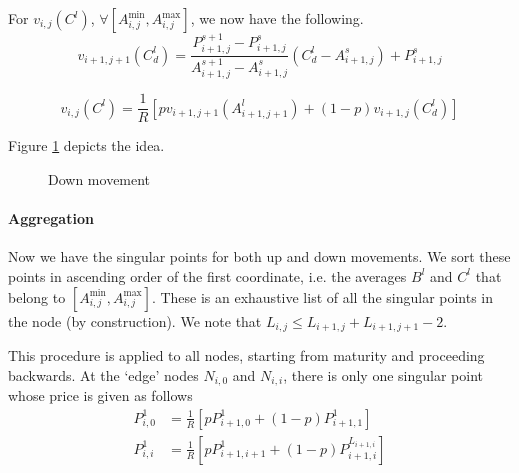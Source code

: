 For $ v_{i,j}( C^l ) $, $ \forall \left[ A_{i,j}^{\min}, A_{i,j}^{\max} \right] $, we now have the following.
\begin{equation}
	\label{eq:asian-dn-lint}
	v_{i+1,j+1} \left( C^l_d \right) = \frac{ P_{i+1,j}^{s+1} - P_{i+1,j}^{s} }{ A_{i+1,j}^{s+1} - A_{i+1,j}^{s} } \left( C^l_d - A_{i+1,j}^{s} \right) + P_{i+1,j}^{s}
\end{equation}

\begin{equation}
	\label{eq:asian-dn-pr}
	v_{i,j}( C^l ) = \frac{1}{R} \left[ p v_{i+1,j+1} \left( A_{i+1,j+1}^l \right) + (1 - p) v_{i+1,j} \left( C^l_d \right) \right]
\end{equation}

Figure \ref{fig:asian-2tr-dn} depicts the idea.
\begin{figure}[h]
	
	\caption{Down movement}
	\label{fig:asian-2tr-dn}
\end{figure}


\paragraph{Aggregation}

Now we have the singular points for both up and down movements. We sort these points in ascending order of the first coordinate, i.e. the averages $ B^l $ and $ C^l $ that belong to $ \left[ A_{i,j}^{\min}, A_{i,j}^{\max} \right] $. These is an exhaustive list of all the singular points in the node (by construction). We note that $ L_{i,j} \le L_{i+1,j} + L_{i+1,j+1} - 2 $.

This procedure is applied to all nodes, starting from maturity and proceeding backwards. At the `edge' nodes $ N_{i,0} $ and $ N_{i,i} $, there is only one singular point whose price is given as follows
\begin{subequations}
	\label{eq:asian-terminal-nodes}
	\begin{align}
		P_{i,0}^1 &= \frac{1}{R} \left[ p P_{i+1,0}^1 + (1 - p) P_{i+1,1}^1 \right] \\
		P_{i,i}^1 &= \frac{1}{R} \left[ p P_{i+1,i+1}^1 + (1 - p) P_{i+1,i}^{L_{i+1,i}} \right]
	\end{align}
\end{subequations}


